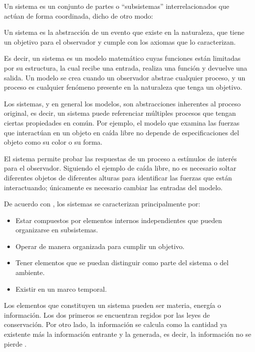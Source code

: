 Un sistema es un conjunto de partes o ``subsistemas'' interrelacionados que actúan de forma coordinada, dicho de otro modo:
\begin{definition}
	Un sistema es la abstracción de un evento que existe en la naturaleza, que tiene un objetivo para el observador y cumple con los axiomas que lo caracterizan.
	\label{def_sistema}
\end{definition}

Es decir, un sistema es un modelo matemático cuyas funciones están limitadas por su estructura, la cual recibe una entrada, realiza una función y devuelve una salida. Un modelo se crea cuando un observador abstrae cualquier proceso, y un proceso es cualquier fenómeno presente en la naturaleza que tenga un objetivo. 

Los sistemas, y en general los modelos, son abstracciones inherentes al proceso original, es decir, un sistema puede referenciar múltiples procesos que tengan ciertas propiedades en común. Por ejemplo, el modelo que examina las fuerzas que interactúan en un objeto en caída libre no depende de especificaciones del objeto como su color o su forma. 

El sistema permite probar las respuestas de un proceso a estímulos de interés para el observador. Siguiendo el ejemplo de caída libre, no es necesario soltar diferentes objetos de diferentes alturas para identificar las fuerzas que están interactuando; únicamente es necesario cambiar las entradas del modelo.

De acuerdo con \cite{Concepto2025_sistema}, los sistemas se caracterizan principalmente por:

\begin{itemize}[nosep]
	\item Estar compuestos por elementos internos independientes que pueden organizarse en subsistemas.
	\item Operar de manera organizada para cumplir un objetivo.
	\item Tener elementos que se puedan distinguir como parte del sistema o del ambiente.
	\item Existir en un marco temporal.	
\end{itemize}

Los elementos que constituyen un sistema pueden ser materia, energía o información. Los dos primeros se encuentran regidos por las leyes de conservación. Por otro lado, la información se calcula como la cantidad ya existente más la información entrante y la generada, es decir, la información no se pierde \cite{Arnold1998_def_tgs}.

